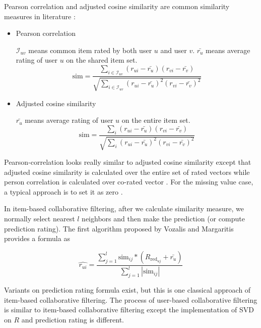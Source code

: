 \documentclass[letter paper, 11pt]{article}
\begin{document}
	
	Pearson correlation and adjusted cosine similarity are common similarity measures in literature\cite{CF}\cite{ApplySVD} \cite{new-sim} \cite{sim-CF} \cite{CF-sign}:
	\begin{itemize}
		\item Pearson correlation
		
		$\mathcal{I}_{uv}$ means common item rated by both user $u$ and user $v$. $\bar{r_u}$ means average rating of user $u$ on the shared item set.
		\begin{equation}
			\text{sim} = \frac{\sum_{i \in \mathcal{I}_{uv}}(r_{ui} - \bar{r_u})(r_{vi} - \bar{r_v})}{\sqrt{\sum_{i \in \mathcal{I}_{uv}}(r_{ui} - \bar{r_u})^2(r_{vi} - \bar{r_v})^2}}
		\end{equation}
		
		\item Adjusted cosine similarity
		
		$\bar{r_u}$ means average rating of user $u$ on the entire item set.
		\begin{equation}
			\text{sim} = \frac{\sum_{i}(r_{ui} - \bar{r_u})(r_{vi} - \bar{r_v})}{\sqrt{\sum_{i}(r_{ui} - \bar{r_u})^2(r_{vi} - \bar{r_v})^2}}
		\end{equation}
	
	\end{itemize}


	Pearson-correlation looks really similar to adjusted cosine similarity except that adjusted cosine similarity is calculated over the entire set of rated vectors while person correlation is calculated over co-rated vector \cite{sim}. For the missing value case, a typical approach is to set it as zero \cite{new-sim}.

	In item-based collaborative filtering, after we calculate similarity measure, we normally select nearest $l$ neighbors and then make the prediction (or compute prediction rating). The first algorithm proposed by Vozalis and Margaritis \cite{ApplySVD} provides a formula as
	
	\begin{equation}
		\hat{r_{ui}} = \dfrac{\sum_{j = 1}^{l} \text{sim}_{ij} * (R_{\text{red}_{uj}} + \bar{r_u})}{\sum_{j=1}^{l} |\text{sim}_{ij}|}
	\end{equation}

	Variants on prediction rating formula exist, but this is one classical approach of item-based collaborative filtering. The process of user-based collaborative filtering is similar to item-based collaborative filtering except the implementation of SVD on $R$ and prediction rating is different. 
	
\end{document}
